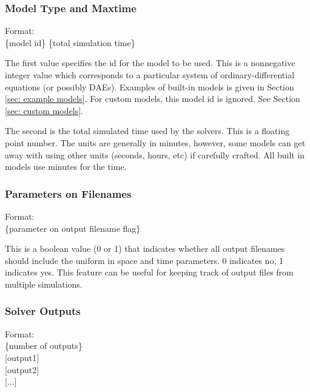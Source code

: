 \documentclass[12pt]{article}
\newenvironment{codeindent}
{\begin{list}{}
        {\setlength{\leftmargin}{.1in}}
        \item[]
}
{\end{list}}
\begin{document}
\subsubsection{Model Type and Maxtime} \label{sec: model type and maxtime}

\begin{codeindent}
Format: \\
\{model id\} \{total simulation time\}
\end{codeindent}

The first value specifies the id for the model to be used. This is a nonnegative integer value which corresponds to a particular system of ordinary-differential equations (or possibly DAEs). Examples of built-in models is given in Section \ref{sec: example models}. For custom models, this model id is ignored. See Section \ref{sec: custom models}.

The second is the total simulated time used by the solvers. This is a floating point number. The units are generally in minutes, however, some models can get away with using other units (seconds, hours, etc) if carefully crafted. All built in models use minutes for the time.

\subsubsection{Parameters on Filenames} \label{sec: parameters on filenames}

\begin{codeindent}
 Format: \\
 \{parameter on output filename flag\}
\end{codeindent}

This is a boolean value (0 or 1) that indicates whether all output filenames should include the uniform in space and time parameters. 0 indicates no, 1 indicates yes. This feature can be useful for keeping track of output files from multiple simulations.

\subsubsection{Solver Outputs} \label{sec: solver outputs}

\begin{codeindent}
 Format: \\
 \{number of outputs\} \\
 {[}output1{]} \\
 {[}output2{]} \\
 {[}...{]}
\end{codeindent}
\end{document}
